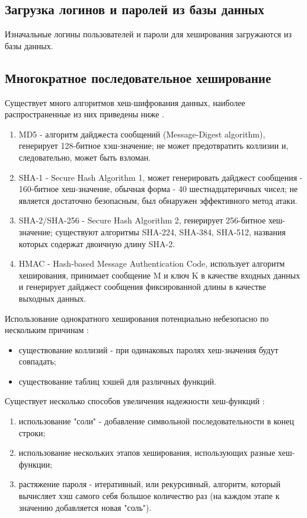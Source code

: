 \documentclass[12pt]{report}
\begin{document}
    \subsection{Загрузка логинов и паролей из базы данных}
    Изначальные логины пользователей и пароли для хеширования загружаются из базы данных.
    
    \subsection{Многократное последовательное хеширование}
    Существует много алгоритмов хеш-шифрования данных, наиболее распространенные из них приведены ниже \cite{hashes}.
    \begin{enumerate}
    	\item MD5 - алгоритм дайджеста сообщений (Message-Digest algorithm), генерирует 128-битное хэш-значение; не может предотвратить коллизии и, следовательно, может быть взломан.
    	\item SHA-1 - Secure Hash Algorithm 1, может генерировать дайджест сообщения - 160-битное хеш-значение, обычная форма - 40 шестнадцатеричных чисел; не является достаточно безопасным, был обнаружен эффективного метод атаки.
    	\item SHA-2/SHA-256 - Secure Hash Algorithm 2, генерирует 256-битное хеш-значение; существуют алгоритмы SHA-224, SHA-384, SHA-512, названия которых содержат двоичную длину SHA-2.
    	\item HMAC - Hash-based Message Authentication Code, использует алгоритм хеширования, принимает сообщение M и ключ K в качестве входных данных и генерирует дайджест сообщения фиксированной длины в качестве выходных данных.
    \end{enumerate}
    
    Использование однократного хеширования потенциально небезопасно по нескольким причинам \cite{security}:
    \begin{itemize}
    	\item существование коллизий - при одинаковых паролях хеш-значения будут совпадать;
    	\item существование таблиц хэшей для различных функций.
    \end{itemize}
    
    Существует несколько способов увеличения надежности хеш-функций \cite{security}:
    \begin{enumerate}
    	\item использование "соли" - добавление символьной последовательности в конец строки;
    	\item использование нескольких этапов хеширования, использующих разные хеш-функции;
    	\item растяжение пароля - итеративный, или рекурсивный, алгоритм, который вычисляет хэш самого себя большое количество раз (на каждом этапе к значению добавляется новая "соль").
    \end{enumerate}
    
\end{document}
